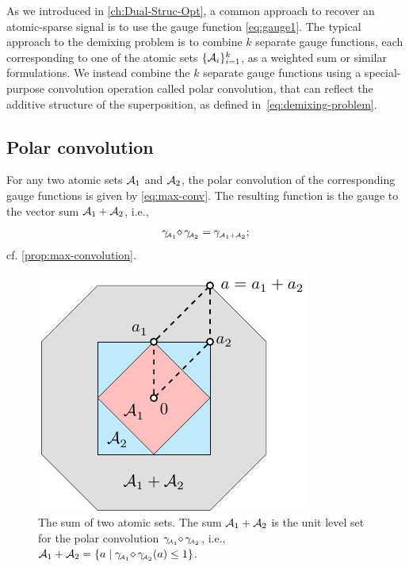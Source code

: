 As we introduced in \autoref{ch:Dual-Struc-Opt}, a common approach to recover an atomic-sparse signal is to use the gauge function \eqref{eq:gauge1}. The typical approach to the demixing problem is to combine $k$ separate gauge functions, each corresponding to one of the atomic sets $\{\mathcal{A}_i\}_{i=1}^k$, as a weighted sum or similar formulations. We instead combine the $k$ separate gauge functions using a special-purpose convolution operation called polar convolution, that can reflect the additive structure of the superposition, as defined in~\eqref{eq:demixing-problem}.

\subsection{Polar convolution} \label{sec:3-1-1}

For any two atomic sets $\mathcal{A}_1$ and $\mathcal{A}_2$, the polar convolution of the corresponding gauge functions is given by \eqref{eq:max-conv}.
The resulting function is the gauge to the vector sum $\mathcal{A}_1+\mathcal{A}_2$, i.e.,
\begin{equation}\label{eq-polar-convolution-sum}
  \gamma_{\!\scriptscriptstyle\mathcal{A}_1}\!\mathop{\diamond}\gamma_{\!\scriptscriptstyle\mathcal{A}_2} = \gamma_{\scriptscriptstyle\mathcal{A}_1+\mathcal{A}_2};
\end{equation}
cf. \autoref{prop:max-convolution}. 

\begin{figure}[t]
    \centering
    \includegraphics[page=1]{./figures/illustrations2.pdf}
    \caption{The sum of two atomic sets. The sum \(\mathcal{A}_1+\mathcal{A}_2\) is the unit level set for the polar convolution $\gamma_{\!\scriptscriptstyle\mathcal{A}_1}\!\mathop{\diamond}\gamma_{\!\scriptscriptstyle\mathcal{A}_2}$, i.e., $\mathcal{A}_1+\mathcal{A}_2 = \{a \mid \gamma_{\!\scriptscriptstyle\mathcal{A}_1}\!\mathop{\diamond}\gamma_{\!\scriptscriptstyle\mathcal{A}_2}(a) \leq 1\}$.\label{fig:sum-sets}}
\end{figure}

